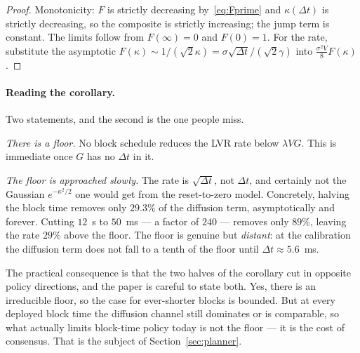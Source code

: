 \documentclass[11pt]{article}
\theoremstyle{definition}
\theoremstyle{remark}
\newcommand{\dt}{\Delta t}
\newcommand{\1}{\mathbf{1}}
\begin{document}
\begin{proof}
Monotonicity: $F$ is strictly decreasing by~\eqref{eq:Fprime} and $\kappa(\dt)$ is strictly decreasing, so the composite is strictly increasing; the jump term is constant. The limits follow from $F(\infty) = 0$ and $F(0) = 1$. For the rate, substitute the asymptotic $F(\kappa) \sim 1/(\sqrt2\kappa) = \sigma\sqrt{\dt}/(\sqrt2\gamma)$ into $\tfrac{\sigma^2V}{8}F(\kappa)$. \end{proof}

\paragraph{Reading the corollary.} Two statements, and the second is the one people miss.

\emph{There is a floor.} No block schedule reduces the LVR rate below $\lambda VG$. This is immediate once $G$ has no $\dt$ in it.

\emph{The floor is approached slowly.} The rate is $\sqrt{\dt}$, not $\dt$, and certainly not the Gaussian $e^{-\kappa^2/2}$ one would get from the reset-to-zero model. Concretely, halving the block time removes only $29.3\%$ of the diffusion term, asymptotically and forever. Cutting $12$~s to $50$~ms --- a factor of $240$ --- removes only $89\%$, leaving the rate $29\%$ above the floor. The floor is genuine but \emph{distant}: at the calibration the diffusion term does not fall to a tenth of the floor until $\dt \approx 5.6$~ms.

The practical consequence is that the two halves of the corollary cut in opposite policy directions, and the paper is careful to state both. Yes, there is an irreducible floor, so the case for ever-shorter blocks is bounded. But at every deployed block time the diffusion channel still dominates or is comparable, so what actually limits block-time policy today is not the floor --- it is the cost of consensus. That is the subject of Section~\ref{sec:planner}.
\end{document}
